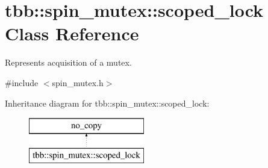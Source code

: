 \hypertarget{classtbb_1_1spin__mutex_1_1scoped__lock}{}\section{tbb\+:\+:spin\+\_\+mutex\+:\+:scoped\+\_\+lock Class Reference}
\label{classtbb_1_1spin__mutex_1_1scoped__lock}


Represents acquisition of a mutex.  




{\ttfamily \#include $<$spin\+\_\+mutex.\+h$>$}

Inheritance diagram for tbb\+:\+:spin\+\_\+mutex\+:\+:scoped\+\_\+lock\+:\begin{figure}[H]
\begin{center}
\leavevmode
\includegraphics[height=2.000000cm]{classtbb_1_1spin__mutex_1_1scoped__lock}
\end{center}
\end{figure}
